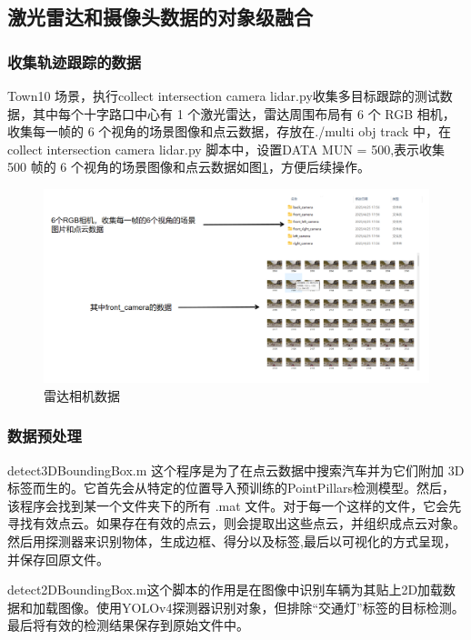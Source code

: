 \subsection{激光雷达和摄像头数据的对象级融合}
\subsubsection{收集轨迹跟踪的数据}
Town10 场景，执行collect intersection camera lidar.py收集多目标跟踪的测试数据，其中每个十字路口中心有 1 个激光雷达，雷达周围布局有 6 个 RGB 相机，收集每一帧的 6 个视角的场景图像和点云数据，存放在./multi obj track 中，在 collect intersection camera lidar.py 脚本中，设置DATA MUN = 500,表示收集 500 帧的 6 个视角的场景图像和点云数据如图\ref{fig:p12}，方便后续操作。



\begin{figure}[htbp] %
	\centering
	\includegraphics[width=1\textwidth]{p12} %
	\caption{雷达相机数据} %
	\label{fig:p12} %
\end{figure}



\subsubsection{数据预处理}


detect3DBoundingBox.m 这个程序是为了在点云数据中搜索汽车并为它们附加 3D 标签而生的。它首先会从特定的位置导入预训练的PointPillars检测模型。然后，该程序会找到某一个文件夹下的所有 .mat 文件。对于每一个这样的文件，它会先寻找有效点云。如果存在有效的点云，则会提取出这些点云，并组织成点云对象。然后用探测器来识别物体，生成边框、得分以及标签,最后以可视化的方式呈现，并保存回原文件。

detect2DBoundingBox.m这个脚本的作用是在图像中识别车辆为其贴上2D加载数据和加载图像。使用YOLOv4探测器识别对象，但排除“交通灯”标签的目标检测。最后将有效的检测结果保存到原始文件中。



